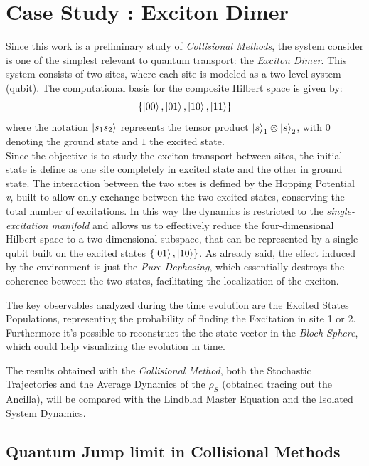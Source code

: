 \documentclass[a4paper,12pt]{article}
\begin{document}
	\section{Case Study : Exciton Dimer}
	\label{sec:exciton_dimer}
	Since this work is a preliminary study of \textit{Collisional Methods}, the system consider is one of the simplest relevant to quantum transport: the \textit{Exciton Dimer}. This system consists of two sites, where each site is modeled as a two-level system (qubit). The computational basis for the composite Hilbert space is given by:
	\begin{equation}
		\left\{\ket{00}, \ket{01}, \ket{10}, \ket{11} \right\}
	\end{equation}
	where the notation $\ket{s_1 s_2}$ represents the tensor product $\ket{s}_1 \otimes \ket{s}_2$, with $0$ denoting the ground state and $1$ the excited state. \\
	Since the objective is to study the exciton transport between sites, the initial state is define as one site completely in excited state and the other in ground state. The interaction between the two sites is defined by the Hopping Potential \textit{v}, built to allow only exchange between the two excited states, conserving the total number of excitations. In this way
	the dynamics is restricted to the \textit{single-excitation manifold} and  allows us to effectively reduce the four-dimensional Hilbert space to a two-dimensional subspace, that can be represented by a single qubit built on the excited states $ \left\{ \ket{01}, \ket{10} \right\} $.
	As already said, the effect induced by the environment is just the \textit{Pure Dephasing}, which essentially destroys the coherence between the two states, facilitating the localization of the exciton.

	The key observables analyzed during the time evolution are the Excited States Populations, representing the probability of finding the Excitation in site 1 or 2. Furthermore it's possible to reconstruct the the state vector in the \textit{Bloch Sphere}, which could help visualizing the evolution in time.

	The results obtained with the \textit{Collisional Method}, both the Stochastic Trajectories and the Average Dynamics of the $ \rho_S $ (obtained tracing out the Ancilla), will be compared with the Lindblad Master Equation and the Isolated System Dynamics.

	\newpage

	\subsection{Quantum Jump limit in Collisional Methods}
	\label{sec:Quantum_Jump_limit_in_Collisional_Methods}
\end{document}
